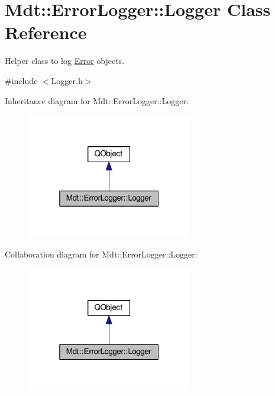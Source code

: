 \hypertarget{class_mdt_1_1_error_logger_1_1_logger}{}\section{Mdt\+:\+:Error\+Logger\+:\+:Logger Class Reference}
\label{class_mdt_1_1_error_logger_1_1_logger}


Helper class to log \hyperlink{class_mdt_1_1_error}{Error} objects.  




{\ttfamily \#include $<$Logger.\+h$>$}



Inheritance diagram for Mdt\+:\+:Error\+Logger\+:\+:Logger\+:
\nopagebreak
\begin{figure}[H]
\begin{center}
\leavevmode
\includegraphics[width=205pt]{class_mdt_1_1_error_logger_1_1_logger__inherit__graph}
\end{center}
\end{figure}


Collaboration diagram for Mdt\+:\+:Error\+Logger\+:\+:Logger\+:
\nopagebreak
\begin{figure}[H]
\begin{center}
\leavevmode
\includegraphics[width=205pt]{class_mdt_1_1_error_logger_1_1_logger__coll__graph}
\end{center}
\end{figure}
